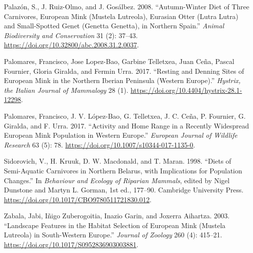 \documentclass[
  letterpaper,
  DIV=11,
  numbers=noendperiod]{scrreprt}
\newlength{\cslhangindent}
\newenvironment{CSLReferences}[2] %
 {\begin{list}{}{%
  \setlength{\itemindent}{0pt}
  \setlength{\leftmargin}{0pt}
  \setlength{\parsep}{0pt}
  \ifodd #1
   \setlength{\leftmargin}{\cslhangindent}
   \setlength{\itemindent}{-1\cslhangindent}
  \fi
  \setlength{\itemsep}{#2\baselineskip}}}
 {\end{list}}
\begin{document}
\begin{CSLReferences}{1}{0}
Palazón, S., J. Ruiz-Olmo, and J. Gosálbez. 2008. {``Autumn-Winter Diet
of Three Carnivores, {European} Mink ({Mustela} Lutreola), {Eurasian}
Otter ({Lutra} Lutra) and Small-Spotted Genet ({Genetta} Genetta), in
Northern {Spain}.''} \emph{Animal Biodiversity and Conservation} 31 (2):
37--43. \url{https://doi.org/10.32800/abc.2008.31.2.0037}.

Palomares, Francisco, Jose Lopez-Bao, Garbine Telletxea, Juan Ceña,
Pascal Fournier, Gloria Giralda, and Fermin Urra. 2017. {``Resting and
Denning Sites of {European} Mink in the Northern {Iberian} {Peninsula}
({Western} {Europe}).''} \emph{Hystrix, the Italian Journal of
Mammalogy} 28 (1). \url{https://doi.org/10.4404/hystrix-28.1-12298}.

Palomares, Francisco, J. V. López-Bao, G. Telletxea, J. C. Ceña, P.
Fournier, G. Giralda, and F. Urra. 2017. {``Activity and Home Range in a
Recently Widespread {European} Mink Population in {Western} {Europe}.''}
\emph{European Journal of Wildlife Research} 63 (5): 78.
\url{https://doi.org/10.1007/s10344-017-1135-0}.

Sidorovich, V., H. Kruuk, D. W. Macdonald, and T. Maran. 1998. {``Diets
of Semi-Aquatic Carnivores in Northern {Belarus}, with Implications for
Population Changes.''} In \emph{Behaviour and {Ecology} of {Riparian}
{Mammals}}, edited by Nigel Dunstone and Martyn L. Gorman, 1st ed.,
177--90. Cambridge University Press.
\url{https://doi.org/10.1017/CBO9780511721830.012}.

Zabala, Jabi, Iñigo Zuberogoitia, Inazio Garin, and Joxerra Aihartza.
2003. {``Landscape Features in the Habitat Selection of {European} Mink
({Mustela} Lutreola) in South-Western {Europe}.''} \emph{Journal of
Zoology} 260 (4): 415--21.
\url{https://doi.org/10.1017/S0952836903003881}.

\end{CSLReferences}
\end{document}
